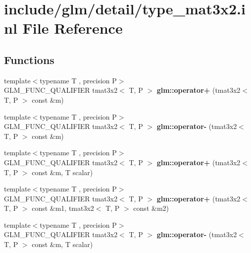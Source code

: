 \hypertarget{type__mat3x2_8inl}{}\section{include/glm/detail/type\+\_\+mat3x2.inl File Reference}
\label{type__mat3x2_8inl}
\subsection*{Functions}
\begin{DoxyCompactItemize}
\item 
\mbox{\label{type__mat3x2_8inl_a1214e20945308ab87fab8459c686caa5}} 
{\footnotesize template$<$typename T , precision P$>$ }\\G\+L\+M\+\_\+\+F\+U\+N\+C\+\_\+\+Q\+U\+A\+L\+I\+F\+I\+ER tmat3x2$<$ T, P $>$ {\bfseries glm\+::operator+} (tmat3x2$<$ T, P $>$ const \&m)
\item 
\mbox{\label{type__mat3x2_8inl_a004c944e52b621d162e27b2923ff5d8d}} 
{\footnotesize template$<$typename T , precision P$>$ }\\G\+L\+M\+\_\+\+F\+U\+N\+C\+\_\+\+Q\+U\+A\+L\+I\+F\+I\+ER tmat3x2$<$ T, P $>$ {\bfseries glm\+::operator-\/} (tmat3x2$<$ T, P $>$ const \&m)
\item 
\mbox{\label{type__mat3x2_8inl_aeda033274359453516cd5137cf892765}} 
{\footnotesize template$<$typename T , precision P$>$ }\\G\+L\+M\+\_\+\+F\+U\+N\+C\+\_\+\+Q\+U\+A\+L\+I\+F\+I\+ER tmat3x2$<$ T, P $>$ {\bfseries glm\+::operator+} (tmat3x2$<$ T, P $>$ const \&m, T scalar)
\item 
\mbox{\label{type__mat3x2_8inl_a16ca58b9b3b4625e4b708c8a91df3a71}} 
{\footnotesize template$<$typename T , precision P$>$ }\\G\+L\+M\+\_\+\+F\+U\+N\+C\+\_\+\+Q\+U\+A\+L\+I\+F\+I\+ER tmat3x2$<$ T, P $>$ {\bfseries glm\+::operator+} (tmat3x2$<$ T, P $>$ const \&m1, tmat3x2$<$ T, P $>$ const \&m2)
\item 
\mbox{\label{type__mat3x2_8inl_a698dbc56de9b450cc0332ab8aaa72550}} 
{\footnotesize template$<$typename T , precision P$>$ }\\G\+L\+M\+\_\+\+F\+U\+N\+C\+\_\+\+Q\+U\+A\+L\+I\+F\+I\+ER tmat3x2$<$ T, P $>$ {\bfseries glm\+::operator-\/} (tmat3x2$<$ T, P $>$ const \&m, T scalar)

\end{DoxyCompactItemize}
